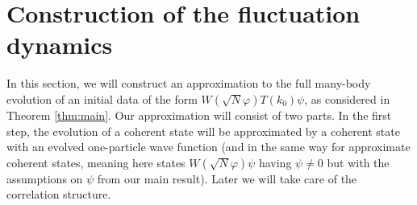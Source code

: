 \documentclass[11pt,a4paper]{article}
\begin{document}
\section{Construction of the fluctuation dynamics}

In this section, we will construct an approximation to the full many-body evolution of an initial data of the form $W(\sqrt{N} \varphi) T(k_0) \psi$, as considered in Theorem \ref{thm:main}. 
Our approximation will consist of two parts. In the first step, the evolution of a coherent state will be approximated by a coherent state with an evolved one-particle wave function (and in the same way for approximate coherent states, meaning here states $W(\sqrt{N} \varphi) \psi$ having $\psi \neq 0$ but with the assumptions on $\psi$ from our main result). Later we will take care of the correlation structure.
\end{document}
